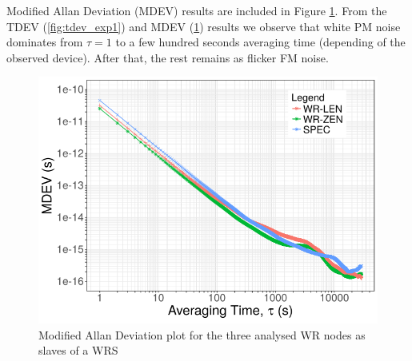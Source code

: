 Modified Allan Deviation (MDEV) results are included in Figure 
\ref{fig:mdev_exp1}. From the TDEV (\ref{fig:tdev_exp1}) and MDEV (\ref{fig:mdev_exp1}) results we observe that white PM noise dominates from $\tau=1$ to a few hundred  seconds averaging time (depending of the observed device). After that, the rest remains as flicker FM noise.

\begin{figure}
    \centering
    \includegraphics[width=0.7\linewidth]{img/mdev_exp1}
    \caption[MDEV for the WR devices comparison.]{Modified Allan Deviation plot for the three analysed WR nodes as slaves of a WRS}
    \label{fig:mdev_exp1}
\end{figure}


